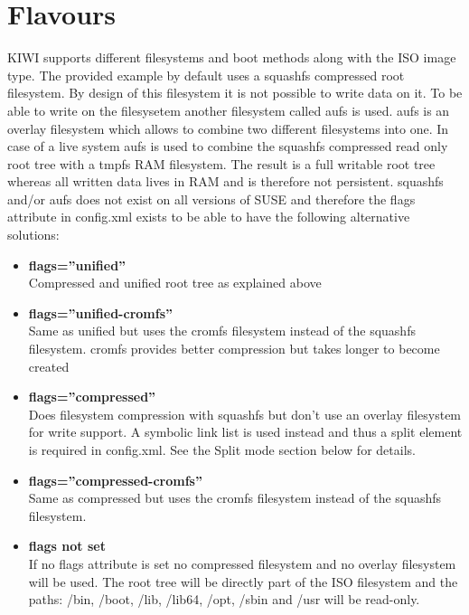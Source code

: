 \section{Flavours}

KIWI supports different filesystems and boot methods along with the
ISO image type. The provided example by default uses a squashfs compressed
root filesystem. By design of this filesystem it is not possible to write
data on it. To be able to write on the filesysetem another filesystem called
aufs is used. aufs is an overlay filesystem which allows to combine two
different filesystems into one. In case of a live system aufs is used
to combine the squashfs compressed read only root tree with a tmpfs
RAM filesystem. The result is a full writable root tree whereas all
written data lives in RAM and is therefore not persistent. squashfs and/or
aufs does not exist on all versions of SUSE and therefore the flags
attribute in config.xml exists to be able to have the following
alternative solutions:

\begin{itemize}
\item \textbf{flags=''unified''}\\
      Compressed and unified root tree as explained above
\item \textbf{flags=''unified-cromfs''}\\
      Same as unified but uses the cromfs filesystem instead of the
      squashfs filesystem. cromfs provides better compression but takes
      longer to become created
\item \textbf{flags=''compressed''}\\
      Does filesystem compression with squashfs but don't use an
      overlay filesystem for write support. A symbolic link list is used
      instead and thus a split element is required in config.xml.
      See the Split mode section below for details.
\item \textbf{flags=''compressed-cromfs''}\\
      Same as compressed but uses the cromfs filesystem instead of
      the squashfs filesystem.
\item \textbf{flags not set}\\
      If no flags attribute is set no compressed filesystem and no overlay
      filesystem will be used. The root tree will be directly part of
      the ISO filesystem and the paths: /bin, /boot, /lib, /lib64, /opt,
      /sbin and /usr will be read-only.
\end{itemize}


